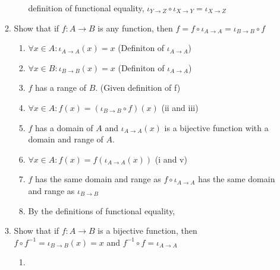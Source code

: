 \documentclass{article}
\begin{document}
\begin{enumerate}
\begin{enumerate}
\begin{enumerate}
                            definition of functional equality, ${\iota}_{Y
                            \rightarrow Z} \circ {\iota}_{X \rightarrow Y} =
                            {\iota}_{X \rightarrow Z}$
                    \end{enumerate}
                \item Show that if $f : A \rightarrow B$ is any function, then $f = f \circ {\iota}_{A \rightarrow A} = {\iota}_{B \rightarrow B} \circ f$
                    \begin{enumerate}
                        \item $\forall x \in A: {\iota}_{A \rightarrow A}(x) = x$ (Definiton of ${\iota}_{A \rightarrow A}$)
                        \item $\forall x \in B: {\iota}_{B \rightarrow B}(x) = x$ (Definiton of ${\iota}_{A \rightarrow A}$)
                        \item $f$ has a range of $B$. (Given definition of f)
                        \item $\forall x \in A: f(x) = ({\iota}_{B \rightarrow B} \circ f)(x)$ (ii and iii)
                        \item $f$ has a domain of $A$ and ${\iota}_{A \rightarrow A}(x)$ is a bijective function with a domain and range of $A$.
                        \item $\forall x \in A: f(x) = f({\iota}_{A \rightarrow A}(x))$ (i and v)
                        \item $f$ has the same domain and range as $f \circ
                            {\iota}_{A \rightarrow A}$ has the same domain and
                            range as ${\iota}_{B \rightarrow B}$
                        \item By the definitions of functional equality, 
                    \end{enumerate}
                \item Show that if $f : A \rightarrow B$ is a bijective
                    function, then $f \circ f^{-1} = {\iota}_{B \rightarrow
                    B}(x) = x$ and $f^{-1} \circ f = {\iota}_{A \rightarrow A}$
                    \begin{enumerate}
                        \item 
                    \end{enumerate}
            \end{enumerate}
    \end{enumerate}
\end{document}
